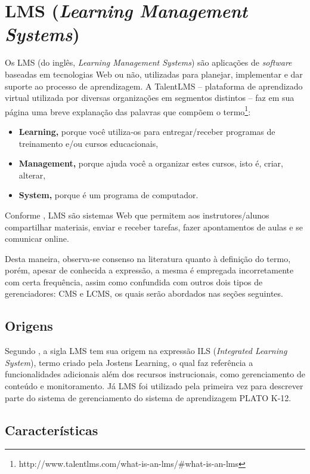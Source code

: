 \documentclass[12pt]{article}
\begin{document}
\section{LMS (\textit{Learning Management Systems})} \label{sec:lms}

Os LMS (do inglês, \textit{Learning Management Systems}) são aplicações de \textit{software} baseadas em tecnologias Web ou não, utilizadas para 
planejar, implementar e dar suporte ao processo de aprendizagem. A TalentLMS -- plataforma de aprendizado virtual utilizada por diversas 
organizações em segmentos distintos -- faz em sua página uma breve explanação das 
palavras que compõem o termo\footnote{http://www.talentlms.com/what-is-an-lms/\#what-is-an-lms}:

\begin{itemize}
 \item \textbf{Learning,} porque você utiliza-os para entregar/receber programas de treinamento e/ou cursos educacionais, 
 \item \textbf{Management,} porque ajuda você a organizar estes cursos, isto é, criar, alterar,
 \item \textbf{System, } porque é um programa de computador.
\end{itemize}

Conforme \cite{lonn2009saving}, LMS são sistemas Web que permitem aos instrutores/alunos compartilhar materiais, enviar e receber tarefas, fazer 
apontamentos de aulas e se comunicar online. 

Desta maneira, observa-se consenso na literatura quanto à definição do termo, porém, apesar de 
conhecida a expressão, a mesma é empregada incorretamente com certa frequência, assim como confundida com outros dois tipos de gerenciadores: 
CMS e LCMS, os quais serão abordados nas seções seguintes.

\subsection{Origens}

Segundo \cite{watson2007learning}, a sigla LMS tem sua origem na expressão ILS (\textit{Integrated Learning System}), termo criado pela Jostens 
Learning, o qual faz referência a funcionalidades adicionais além dos recursos instrucionais, como gerenciamento de conteúdo e monitoramento. 
Já LMS foi utilizado pela primeira vez para descrever parte do sistema de gerenciamento do sistema de aprendizagem PLATO K-12.

\subsection{Características}
\end{document}
